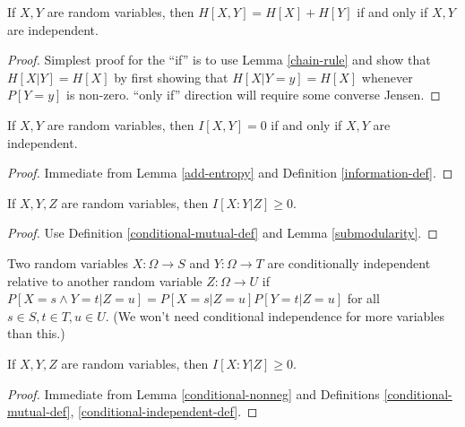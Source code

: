 \begin{lemma}\label{add-entropy}  If $X,Y$ are random variables, then $H[X,Y] = H[X] + H[Y]$ if and only if $X,Y$ are independent.
\end{lemma}

\begin{proof} Simplest proof for the ``if'' is to use Lemma \ref{chain-rule} and show that $H[X|Y] = H[X]$ by first showing that $H[X|Y=y] = H[X]$ whenever $P[Y=y]$ is non-zero.  ``only if'' direction will require some converse Jensen.
\end{proof}


\begin{corollary}\label{vanish-entropy}  If $X,Y$ are random variables, then $I[X,Y] = 0$ if and only if $X,Y$ are independent.
\end{corollary}

\begin{proof} Immediate from Lemma \ref{add-entropy} and Definition \ref{information-def}.
\end{proof}

\begin{definition}[Conditional mutual information]\label{conditional-mutual-def}\uses{information-def,{condition-event-def}  If $X,Y,Z$ are random variables, with $Z$ $U$-valued, then
  $$ I[X:Y|Z] := \sum_{z \in U} P[Z=z] I[(X|Z=z): (Y|Z=z)].$$
\end{definition}

\begin{lemma}\label{conditional-nonneg}  
If $X,Y,Z$ are random variables, then $I[X:Y|Z] \ge 0$.
\end{lemma}

\begin{proof} Use Definition \ref{conditional-mutual-def} and Lemma \ref{submodularity}.
\end{proof}

\begin{definition}\label{conditional-independent-def}
  Two random variables $X: \Omega \to S$ and $Y: \Omega \to T$ are conditionally independent relative to another random variable $Z: \Omega \to U$ if $P[ X = s \wedge Y = t| Z=u] = P[X=s|Z=u] P[Y=t|Z=u]$ for all $s \in S, t \in T, u \in U$.  (We won't need conditional independence for more variables than this.)
\end{definition}

\begin{lemma}\label{conditional-vanish}  
  If $X,Y,Z$ are random variables, then $I[X:Y|Z] \ge 0$.
\end{lemma}

\begin{proof} Immediate from Lemma \ref{conditional-nonneg} and Definitions \ref{conditional-mutual-def}, \ref{conditional-independent-def}.
\end{proof}
